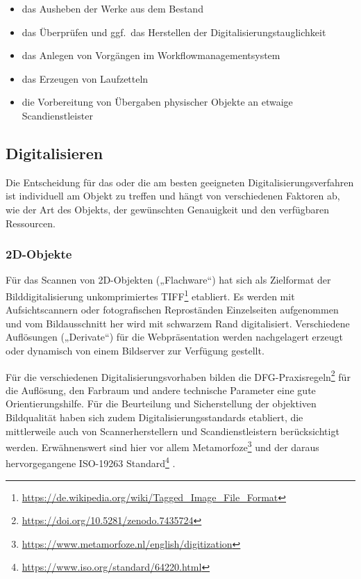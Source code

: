 \documentclass[
  11pt,
  letterpaper,
  DIV=11,
  twoside]{scrreprt}
\DeclareRobustCommand{\href}[2]{#2\footnote{\url{#1}}}
\begin{document}
\begin{itemize}
\item
  das Ausheben der Werke aus dem Bestand
\item
  das Überprüfen und ggf.~das Herstellen der
  Digitalisierungstauglichkeit
\item
  das Anlegen von Vorgängen im Workflowmanagementsystem
\item
  das Erzeugen von Laufzetteln
\item
  die Vorbereitung von Übergaben physischer Objekte an etwaige
  Scandienstleister
\end{itemize}

\subsection{Digitalisieren}\label{digitalisieren}

Die Entscheidung für das oder die am besten geeigneten
Digitalisierungsverfahren ist individuell am Objekt zu treffen und hängt
von verschiedenen Faktoren ab, wie der Art des Objekts, der gewünschten
Genauigkeit und den verfügbaren Ressourcen.

\subsubsection{2D-Objekte}\label{d-objekte}

Für das Scannen von 2D-Objekten („Flachware``) hat sich als Zielformat
der Bilddigitalisierung unkomprimiertes
\href{https://de.wikipedia.org/wiki/Tagged_Image_File_Format}{TIFF}
etabliert. Es werden mit Aufsichtscannern oder fotografischen
Reproständen Einzelseiten aufgenommen und vom Bildausschnitt her wird
mit schwarzem Rand digitalisiert. Verschiedene Auflösungen („Derivate``)
für die Webpräsentation werden nachgelagert erzeugt oder dynamisch von
einem Bildserver zur Verfügung gestellt.

Für die verschiedenen Digitalisierungsvorhaben bilden die
\href{https://doi.org/10.5281/zenodo.7435724}{DFG-Praxisregeln} für die
Auflösung, den Farbraum und andere technische Parameter eine gute
Orientierungshilfe. Für die Beurteilung und Sicherstellung der
objektiven Bildqualität haben sich zudem Digitalisierungsstandards
etabliert, die mittlerweile auch von Scannerherstellern und
Scandienstleistern berücksichtigt werden. Erwähnenswert sind hier vor
allem
\href{https://www.metamorfoze.nl/english/digitization}{Metamorfoze} und
der daraus hervorgegangene
\href{https://www.iso.org/standard/64220.html}{ISO-19263 Standard} .
\end{document}
